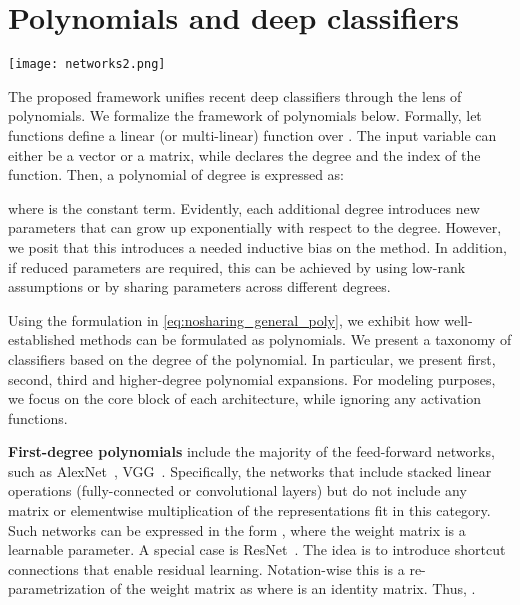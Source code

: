 \documentclass[runningheads]{llncs}
\newcommand{\resnet}{ResNet}
\newcommand{\noshare}{PDC}
\providecommand\eg{e.g.,}
\providecommand\ie{i.e.,}
\begin{document}
 \section{Polynomials and deep classifiers}
\label{sec:nosharing_taxonomy}




  

 

\begin{figure*}[t!]
  \centering
    \texttt{[image: networks2.png]}
    \caption{Blocks (up to third-degree) from different architectures. The layers (\ie{} blue boxes) denote any linear operation, \eg{} a convolution or a fully-connected layer, depending on the architecture. From left to right, the degree of the polynomial is increasing. Our framework enables also to complete the missing terms of the polynomial (\ie{} \noshare-NL versus NL). }
  \label{fig:nosharing_blocks}
\end{figure*}

The proposed framework unifies recent deep classifiers through the lens of polynomials. 
We formalize the framework of polynomials below. Formally, let functions  define a linear (or multi-linear) function over . The input variable   can either be a vector or a matrix, while  declares the degree and  the index of the function. Then, a polynomial of degree is expressed as: 

where  is the constant term. Evidently, each additional degree introduces new parameters that can grow up exponentially with respect to the degree. However, we posit that this introduces a needed inductive bias on the method. In addition, if reduced parameters are required, this can be achieved by using low-rank assumptions or by sharing parameters across different degrees. 



Using the formulation in \eqref{eq:nosharing_general_poly}, we exhibit how well-established methods can be formulated as polynomials. We present a taxonomy of classifiers based on the degree of the polynomial. In particular, we present first, second, third and higher-degree polynomial expansions. For modeling purposes, we focus on the core block of each architecture, while ignoring any activation functions.

\noindent\textbf{First-degree polynomials} include the majority of the feed-forward networks, such as AlexNet~\cite{krizhevsky2012imagenet}, VGG~\cite{simonyan2014very}. Specifically, the networks that include stacked linear operations (fully-connected or convolutional layers) but do not include any matrix or elementwise multiplication of the representations fit in this category. Such networks can be expressed in the form , where the weight matrix  is a learnable parameter. A special case is \resnet~\cite{he2015deep}. The idea is to introduce shortcut connections that enable residual learning. Notation-wise this is a re-parametrization of the weight matrix  as  where  is an identity matrix. Thus, .
\end{document}
